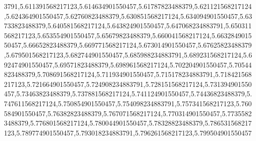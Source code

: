 3791,5.611391568217123,5.614634901550457,5.61787823488379,5.621121568217124,5.624364901550457,5.62760823488379,5.630851568217124,5.634094901550457,5.63733823488379,5.640581568217124,5.643824901550457,5.647068234883791,5.650311568217123,5.653554901550457,5.65679823488379,5.660041568217124,5.663284901550457,5.66652823488379,5.669771568217124,5.673014901550457,5.67625823488379,5.679501568217123,5.682744901550457,5.685988234883791,5.689231568217124,5.692474901550457,5.69571823488379,5.698961568217124,5.702204901550457,5.70544823488379,5.708691568217124,5.711934901550457,5.715178234883791,5.718421568217123,5.721664901550457,5.724908234883791,5.728151568217124,5.731394901550457,5.73463823488379,5.737881568217124,5.741124901550457,5.74436823488379,5.747611568217124,5.750854901550457,5.754098234883791,5.757341568217123,5.760584901550457,5.76382823488379,5.767071568217124,5.770314901550457,5.77355823488379,5.776801568217124,5.780044901550457,5.78328823488379,5.786531568217123,5.789774901550457,5.793018234883791,5.796261568217123,5.799504901550457
